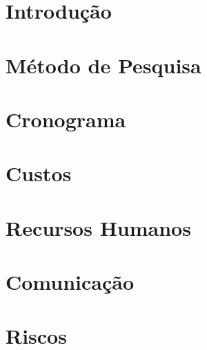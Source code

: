 \documentclass[
    12pt,                   %
    a4paper,                %
    sumario=tradicional,    %
    brazil,                 %
    oneside                 %
]{abntex2}                  %
\begin{document}
    

    \chapter{Introdução}\label{ch:introducao}
    

    \chapter{Método de Pesquisa}\label{ch:metodo-de-pesquisa}
    

    \chapter{Cronograma}\label{ch:cronograma}
    

    \chapter{Custos}\label{ch:custos}
    

    \chapter{Recursos Humanos}\label{ch:recursos-humanos}
    

    \chapter{Comunicação}\label{ch:comunicacao}
%    

    \chapter{Riscos}\label{ch:riscos}
    
\end{document}

